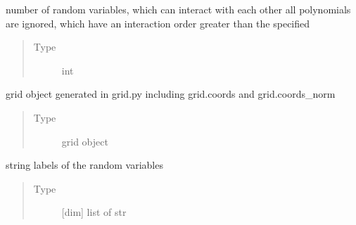\documentclass[letterpaper,10pt,english,openany,oneside]{sphinxmanual}
\begin{document}
\begin{fulllineitems}
\begin{fulllineitems}
\begin{quote}
\begin{description}
\end{description}\end{quote}

\end{fulllineitems}


\begin{fulllineitems}
\label{\detokenize{pygpc:pygpc.gpc.gPC.interaction_order}}
number of random variables, which can interact with each other
all polynomials are ignored, which have an interaction order greater than the specified
\begin{quote}\begin{description}
\item[{Type}] \leavevmode
int

\end{description}\end{quote}

\end{fulllineitems}


\begin{fulllineitems}
\label{\detokenize{pygpc:pygpc.gpc.gPC.grid}}
grid object generated in grid.py including grid.coords and grid.coords\_norm
\begin{quote}\begin{description}
\item[{Type}] \leavevmode
grid object

\end{description}\end{quote}

\end{fulllineitems}


\begin{fulllineitems}
\label{\detokenize{pygpc:pygpc.gpc.gPC.random_vars}}
string labels of the random variables
\begin{quote}\begin{description}
\item[{Type}] \leavevmode
{[}dim{]} list of str

\end{description}\end{quote}


\end{fulllineitems}
\end{fulllineitems}
\end{document}
